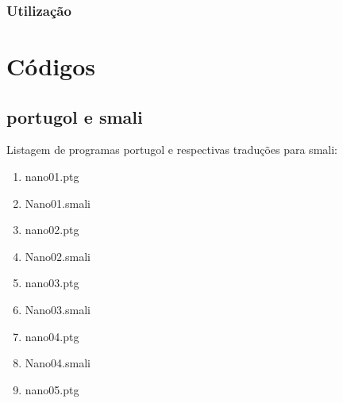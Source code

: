 \documentclass[12pt,a4paper,twoside]{report}
\begin{document}
\subsection{Utilização}


\chapter{Códigos}

\section{portugol e smali}
Listagem de programas portugol e respectivas traduções para smali:
\begin{enumerate}
\item nano01.ptg


\item Nano01.smali


\item nano02.ptg


\item Nano02.smali


\item nano03.ptg


\item Nano03.smali


\item nano04.ptg


\item Nano04.smali


\item nano05.ptg



\end{enumerate}
\end{document}
